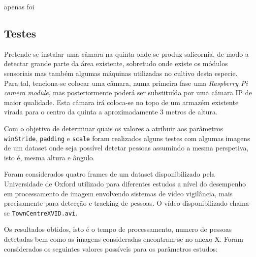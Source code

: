 

















apenas foi 


\subsection{Testes}

Pretende-se instalar uma câmara na quinta onde se produz salicornia, de modo a detectar grande parte da área existente, sobretudo onde existe os módulos sensoriais mas também algumas máquinas utilizadas no cultivo desta especie. Para tal, tenciona-se colocar uma câmara, numa primeira fase uma \textit{Raspberry Pi camera module}, mas posteriormente poderá ser substituída por uma câmara IP de maior qualidade. Esta câmara irá coloca-se no topo de um armazém existente virada para o centro da quinta a aproximadamente 3 metros de altura. 

Com o objetivo de determinar quais os valores a atribuir aos parâmetros \texttt{winStride}, \texttt{padding} e \texttt{scale} foram realizados alguns testes com algumas imagens de um dataset onde seja possível detetar pessoas assumindo a mesma perspetiva, isto é, mesma altura e ângulo.  

Foram considerados quatro frames de um dataset disponibilizado pela Universidade de Oxford utilizado para diferentes estudos a nível do desempenho em processamento de imagem envolvendo sistemas de vídeo vigilância, mais precisamente para detecção e tracking de pessoas\cite{imagProccdata}. O vídeo disponibilizado chama-se \texttt{TownCentreXVID.avi}. 

Os resultados obtidos, isto é o tempo de processamento, numero de pessoas detetadas bem como as imagens consideradas encontram-se no anexo X. Foram considerados os seguintes valores possíveis para os parâmetros estudos: 

